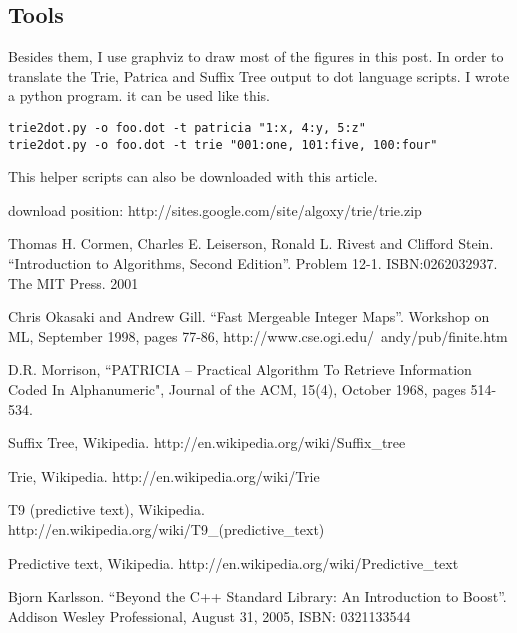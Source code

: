 \documentclass{article}
\begin{document}
\subsection{Tools}

Besides them, I use graphviz to draw most of the figures in this post. In order to
translate the Trie, Patrica and Suffix Tree output to dot language scripts. I wrote a python program.
it can be used like this.

\begin{verbatim}
trie2dot.py -o foo.dot -t patricia "1:x, 4:y, 5:z"
trie2dot.py -o foo.dot -t trie "001:one, 101:five, 100:four"
\end{verbatim}

This helper scripts can also be downloaded with this article.

download position: http://sites.google.com/site/algoxy/trie/trie.zip

\begin{thebibliography}{99}

Thomas H. Cormen, Charles E. Leiserson, Ronald L. Rivest and Clifford Stein.
``Introduction to Algorithms, Second Edition''. Problem 12-1. ISBN:0262032937. The MIT Press. 2001

Chris Okasaki and Andrew Gill. ``Fast Mergeable Integer
Maps''. Workshop on ML, September 1998, pages 77-86, http://www.cse.ogi.edu/~andy/pub/finite.htm

D.R. Morrison, ``PATRICIA -- Practical Algorithm To Retrieve  Information Coded In Alphanumeric", Journal of the ACM, 15(4), October 1968, pages 514-534.

Suffix Tree, Wikipedia. http://en.wikipedia.org/wiki/Suffix\_tree

Trie, Wikipedia. http://en.wikipedia.org/wiki/Trie

T9 (predictive text), Wikipedia. http://en.wikipedia.org/wiki/T9\_(predictive\_text)

Predictive text,
Wikipedia. http://en.wikipedia.org/wiki/Predictive\_text

Bjorn Karlsson. ``Beyond the C++ Standard Library: An Introduction to
Boost''. Addison Wesley Professional, August 31, 2005, ISBN: 0321133544

\end{thebibliography}

\ifx\wholebook\relax\else
\end{document}
